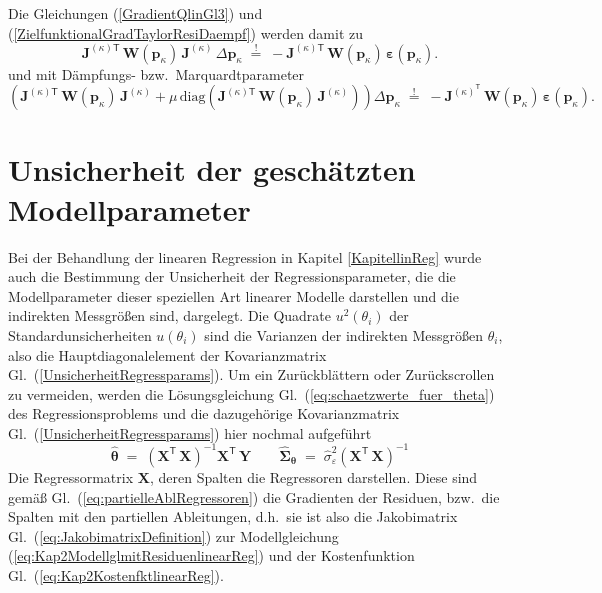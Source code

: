 Die Gleichungen (\ref{GradientQlinGl3}) und (\ref{ZielfunktionalGradTaylorResiDaempf})
werden damit zu
\begin{equation}
 \boldsymbol{J}^{(\kappa) \textsf{T}} \, \mathbf{W}(\mathbf{p}_\kappa) \,
\boldsymbol{J}^{(\kappa)} \, \Delta \mathbf{p}_\kappa
\; \overset{!}{=} \;
-  \boldsymbol{J}^{(\kappa) \textsf{T}} \, \mathbf{W}(\mathbf{p}_\kappa) \,
\boldsymbol{\varepsilon}(\mathbf{p}_\kappa) .
\label{GradientQlinGl3W}
\end{equation}
und mit Dämpfungs- bzw.\ Marquardtparameter
\begin{equation}
\left(
\boldsymbol{J}^{(\kappa) \textsf{T}} \, \mathbf{W}(\mathbf{p}_\kappa) \, \boldsymbol{J}^{(\kappa)}
 + \mu \, \mathrm{diag}(\boldsymbol{J}^{(\kappa) \textsf{T}} \, \mathbf{W}(\mathbf{p}_\kappa) \, \boldsymbol{J}^{(\kappa)}) \right) \Delta \mathbf{p}_\kappa \;
\overset{!}{=} \; - \boldsymbol{J}^{(\kappa)^\textsf{T}} \,
\mathbf{W}(\mathbf{p}_\kappa) \, \boldsymbol{\varepsilon}(\mathbf{p}_\kappa) .
\label{ZielfunktionalGradTaylorResiDaempfW}
\end{equation}

\section{Unsicherheit der geschätzten Modellparameter}
Bei der Behandlung der linearen Regression in Kapitel \ref{KapitellinReg} wurde auch die Bestimmung der Unsicherheit
der Regressionsparameter, die die Modellparameter dieser speziellen Art linearer Modelle darstellen und die
indirekten Messgrößen sind, dargelegt. Die Quadrate $u^2(\theta_i)$ der Standardunsicherheiten $u(\theta_i)$ sind
die Varianzen der indirekten Messgrößen $\theta_i$, also die Hauptdiagonalelement der Kovarianzmatrix
Gl.~(\ref{UnsicherheitRegressparams}). Um ein Zurückblättern oder Zurückscrollen zu vermeiden, werden die
Lösungsgleichung Gl.~(\ref{eq:schaetzwerte_fuer_theta}) des Regressionsproblems und die dazugehörige
Kovarianzmatrix Gl.~(\ref{UnsicherheitRegressparams}) hier nochmal aufgeführt
\begin{equation*}
\boldsymbol{\hat \theta} \; = \;
\left( \mathbf{X}^\mathsf{T}  \, \mathbf{X} \right)^{-1} \mathbf{X}^\mathsf{T} \, \mathbf{Y}
\qquad
\boldsymbol{\hat \Sigma}_{\boldsymbol{\theta}} \; = \; \hat \sigma_{\varepsilon}^2
\left( \mathbf{X}^\mathsf{T}  \, \mathbf{X} \right)^{-1}
\end{equation*}
Die Regressormatrix $\mathbf{X}$, deren Spalten die Regressoren darstellen. Diese sind gemäß Gl.~(\ref{eq:partielleAblRegressoren}) die Gradienten der Residuen, bzw.\ die Spalten mit den
partiellen Ableitungen, d.h.\ sie ist also die Jakobimatrix Gl.~(\ref{eq:JakobimatrixDefinition})
zur Modellgleichung (\ref{eq:Kap2ModellglmitResiduenlinearReg}) und der Kostenfunktion
Gl.~(\ref{eq:Kap2KostenfktlinearReg}).

